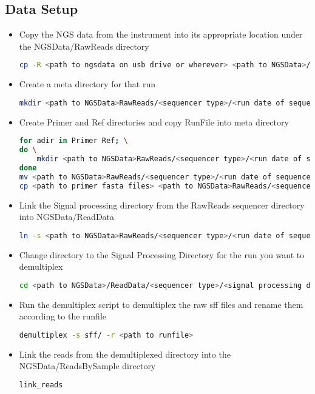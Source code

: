 \documentclass{article}
\begin{document}
\subsection{Data Setup}
\begin{itemize}
\item Copy the NGS data from the instrument into its appropriate location under the NGSData/RawReads directory
{\tiny
\begin{lstlisting}[language=bash]
cp -R <path to ngsdata on usb drive or wherever> <path to NGSData>/RawReads/<sequencer type>/
\end{lstlisting}
}
\item Create a meta directory for that run
{\tiny
\begin{lstlisting}[language=bash]
mkdir <path to NGSData>RawReads/<sequencer type>/<run date of sequencer>/meta
\end{lstlisting}
}
\item Create Primer and Ref directories and copy RunFile into meta directory
{\tiny
\begin{lstlisting}[language=bash]
for adir in Primer Ref; \
do \
    mkdir <path to NGSData>RawReads/<sequencer type>/<run date of sequencer>/meta/${adir}; \
done
mv <path to NGSData>RawReads/<sequencer type>/<run date of sequencer>/<runfile>.txt <path to NGSData>RawReads/<sequencer type>/<run date of sequencer>/meta/
cp <path to primer fasta files> <path to NGSData>RawReads/<sequencer type>/<run date of sequencer>/meta/Primer/
\end{lstlisting}
}
\item Link the Signal processing directory from the RawReads sequencer directory into NGSData/ReadData
{\tiny
\begin{lstlisting}[language=bash]
ln -s <path to NGSData>RawReads/<sequencer type>/<run date of sequencer>/D\_*signalProcessing* <path to NGSData>/ReadData/<sequencer type>/
\end{lstlisting}
}
\item Change directory to the Signal Processing Directory for the run you want to demultiplex
{\tiny
\begin{lstlisting}[language=bash]
cd <path to NGSData>/ReadData/<sequencer type>/<signal processing directory>
\end{lstlisting}
}
\item Run the demultiplex script to demultiplex the raw sff files and rename them according to the runfile
{\tiny
\begin{lstlisting}[language=bash]
demultiplex -s sff/ -r <path to runfile>
\end{lstlisting}
}
\item Link the reads from the demultiplexed directory into the NGSData/ReadsBySample directory
{\tiny
\begin{lstlisting}[language=bash]
link_reads
\end{lstlisting}
}
\end{itemize}
\end{document}
